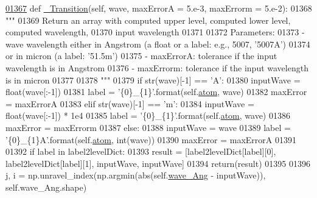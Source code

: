\begin{DoxyCode}
\hypertarget{classpyneb_1_1core_1_1pynebcore_1_1_atom_l01367}{}\hyperlink{classpyneb_1_1core_1_1pynebcore_1_1_atom_a69f29cc10c77910841f9e3ff8ddef250}{01367}     \textcolor{keyword}{def }\hyperlink{classpyneb_1_1core_1_1pynebcore_1_1_atom_a69f29cc10c77910841f9e3ff8ddef250}{\_Transition}(self, wave, maxErrorA = 5.e-3, maxErrorm = 5.e-2):
01368         \textcolor{stringliteral}{"""}
01369 \textcolor{stringliteral}{        Return an array with computed upper level, computed lower level, computed wavelength, }
01370 \textcolor{stringliteral}{            input wavelength}
01371 \textcolor{stringliteral}{        }
01372 \textcolor{stringliteral}{        Parameters:}
01373 \textcolor{stringliteral}{            - wave       wavelength either in Angstrom (a float or a label: e.g., 5007, '5007A') }
01374 \textcolor{stringliteral}{                            or in micron (a label: '51.5m')}
01375 \textcolor{stringliteral}{            - maxErrorA: tolerance if the input wavelength is in Angstrom}
01376 \textcolor{stringliteral}{            - maxErrorm: tolerance if the input wavelength is in micron}
01377 \textcolor{stringliteral}{                            }
01378 \textcolor{stringliteral}{        """}
01379         \textcolor{keywordflow}{if} str(wave)[-1] == \textcolor{stringliteral}{'A'}:
01380             inputWave = float(wave[:-1])
01381             label = \textcolor{stringliteral}{'\{0\}\_\{1\}'}.format(self.\hyperlink{classpyneb_1_1core_1_1pynebcore_1_1_atom_a192f3e20446d7fba81d789bc705d6c71}{atom}, wave)
01382             maxError = maxErrorA
01383         \textcolor{keywordflow}{elif} str(wave)[-1] == \textcolor{stringliteral}{'m'}:
01384             inputWave = float(wave[:-1]) * 1e4
01385             label = \textcolor{stringliteral}{'\{0\}\_\{1\}'}.format(self.\hyperlink{classpyneb_1_1core_1_1pynebcore_1_1_atom_a192f3e20446d7fba81d789bc705d6c71}{atom}, wave)
01386             maxError = maxErrorm
01387         \textcolor{keywordflow}{else}:
01388             inputWave = wave
01389             label = \textcolor{stringliteral}{'\{0\}\_\{1\}A'}.format(self.\hyperlink{classpyneb_1_1core_1_1pynebcore_1_1_atom_a192f3e20446d7fba81d789bc705d6c71}{atom}, int(wave))
01390             maxError = maxErrorA
01391             
01392         \textcolor{keywordflow}{if} label \textcolor{keywordflow}{in} label2levelDict:
01393             result = [label2levelDict[label][0], label2levelDict[label][1], inputWave, inputWave]
01394             return(result)
01395         
01396         j, i = np.unravel\_index(np.argmin(abs(self.\hyperlink{classpyneb_1_1core_1_1pynebcore_1_1_atom_a044e1349bb63766a5f3d25fbf04b5c2c}{wave\_Ang} - inputWave)), self.wave\_Ang.shape)

\end{DoxyCode}
